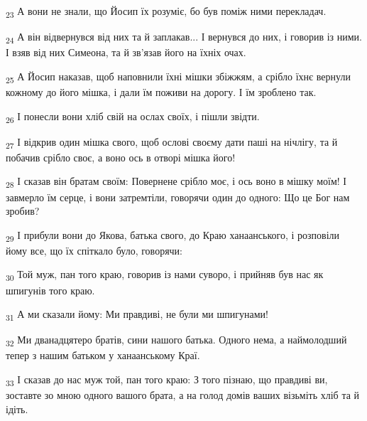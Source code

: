 \begin{tcolorbox}
\textsubscript{23} А вони не знали, що Йосип їх розуміє, бо був поміж ними перекладач.
\end{tcolorbox}
\begin{tcolorbox}
\textsubscript{24} А він відвернувся від них та й заплакав... І вернувся до них, і говорив із ними. І взяв від них Симеона, та й зв'язав його на їхніх очах.
\end{tcolorbox}
\begin{tcolorbox}
\textsubscript{25} А Йосип наказав, щоб наповнили їхні мішки збіжжям, а срібло їхнє вернули кожному до його мішка, і дали їм поживи на дорогу. І їм зроблено так.
\end{tcolorbox}
\begin{tcolorbox}
\textsubscript{26} І понесли вони хліб свій на ослах своїх, і пішли звідти.
\end{tcolorbox}
\begin{tcolorbox}
\textsubscript{27} І відкрив один мішка свого, щоб ослові своєму дати паші на нічлігу, та й побачив срібло своє, а воно ось в отворі мішка його!
\end{tcolorbox}
\begin{tcolorbox}
\textsubscript{28} І сказав він братам своїм: Повернене срібло моє, і ось воно в мішку моїм! І завмерло їм серце, і вони затремтіли, говорячи один до одного: Що це Бог нам зробив?
\end{tcolorbox}
\begin{tcolorbox}
\textsubscript{29} І прибули вони до Якова, батька свого, до Краю ханаанського, і розповіли йому все, що їх спіткало було, говорячи:
\end{tcolorbox}
\begin{tcolorbox}
\textsubscript{30} Той муж, пан того краю, говорив із нами суворо, і прийняв був нас як шпигунів того краю.
\end{tcolorbox}
\begin{tcolorbox}
\textsubscript{31} А ми сказали йому: Ми правдиві, не були ми шпигунами!
\end{tcolorbox}
\begin{tcolorbox}
\textsubscript{32} Ми дванадцятеро братів, сини нашого батька. Одного нема, а наймолодший тепер з нашим батьком у ханаанському Краї.
\end{tcolorbox}
\begin{tcolorbox}
\textsubscript{33} І сказав до нас муж той, пан того краю: З того пізнаю, що правдиві ви, зоставте зо мною одного вашого брата, а на голод домів ваших візьміть хліб та й ідіть.
\end{tcolorbox}
